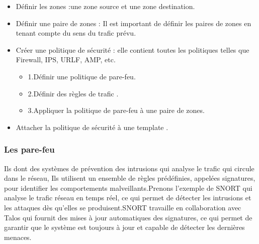 \begin{itemize}
	\item{ Définir les zones :une zone source et une zone destination.} 
\end{itemize}
\begin{itemize}
	\item{ Définir une paire de zones : Il est important de définir les paires de zones en tenant compte du sens du trafic prévu.} 
\end{itemize}
\begin{itemize}
	\item{ Créer une politique de sécurité : elle contient toutes les politiques telles que Firewall, IPS, URLF, AMP, etc.}
		\begin{itemize}
			\item{1.Définir une politique de pare-feu.} 
		\end{itemize}
		\begin{itemize}
			\item{ 2.Définir des règles de trafic .} 
		\end{itemize}
		\begin{itemize}
			\item{3.Appliquer la politique de pare-feu à une paire de zones.} 
		\end{itemize}
		
		
	\end{itemize}
\begin{itemize}
	\item{ Attacher la politique de sécurité à une template .} 
\end{itemize}

\subsubsection{Les pare-feu }

Ils dont des systèmes de prévention des intrusions qui analyse le trafic qui circule dans le réseau, Ils utilisent un ensemble de règles prédéfinies, appelées signatures, pour identifier les comportements malveillants.Prenons l’exemple de SNORT qui analyse le trafic réseau en temps réel, ce qui permet de détecter les intrusions et les attaques dès qu'elles se produisent.SNORT travaille en collaboration avec Talos qui fournit des mises à jour automatiques des signatures, ce qui permet de garantir que le système est toujours à jour et capable de détecter les dernières menaces. 

